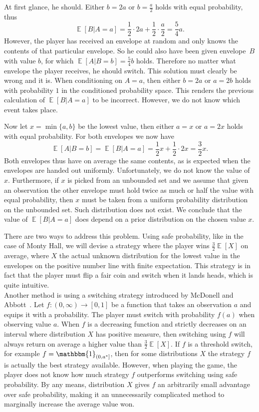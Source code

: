 \documentclass[a4paper]{report}
\theoremstyle{plain}
\theoremstyle{definition}
\theoremstyle{remark}
\numberwithin{equation}{chapter}
\DeclareMathOperator{\E}{\mathbb{E}}
\DeclareMathOperator{\1}{\mathbbm{1}}
\begin{document}
At first glance, he should. Either $b=2a$ or $b=\frac{a}{2}$ holds with equal probability, thus \[\E[B|A=a]=\frac{1}{2}\cdot2a+\frac{1}{2}\cdot\frac{a}{2}=\frac{5}{4}a.\]
However, the player has received an envelope at random and only knows the contents of that particular envelope. So he could also have been given envelope~$B$ with value $b$, for which $\E[A|B=b]=\frac{5}{4}b$ holds. Therefore no matter what envelope the player receives, he should switch. This solution must clearly be wrong and it is. When conditioning on $A=a$, then either $b=2a$ or $a=2b$ holds with probability $1$ in the conditioned probability space. This renders the previous calculation of $\E[B|A=a]$ to be incorrect. However, we do not know which event takes place.

Now let $x=\min\{a,b\}$ be the lowest value, then either $a=x$ or $a=2x$ holds with equal probability. For both envelopes we now have
\[
\E[A|B=b]=\E[B|A=a]=\frac{1}{2}x+\frac{1}{2}\cdot2x=\frac{3}{2}x.
\]
Both envelopes thus have on average the same contents, as is expected when the envelopes are handed out uniformly. Unfortunately, we do not know the value of $x$. Furthermore, if $x$ is picked from an unbounded set and we assume that given an observation the other envelope must hold twice as much or half the value with equal probability, then $x$ must be taken from a uniform probability distribution on the unbounded set. Such distribution does not exist. We conclude that the value of $\E[B|A=a]$ does depend on a prior distribution on the chosen value $x$.

There are two ways to address this problem. Using safe probability, like in the case of Monty Hall, we will devise a strategy where the player wins $\frac{3}{2}\E[X]$ on average, where $X$ the actual unknown distribution for the lowest value in the envelopes on the positive number line with finite expectation. This strategy is in fact that the player must flip a fair coin and switch when it lands heads, which is quite intuitive.\\
Another method is using a switching strategy introduced by McDonell and Abbott~\cite{McDonnell09,Abbott10,McDonnell11}. Let $f\colon (0,\infty)\to[0,1]$ be a function that takes an observation $a$ and equips it with a probability. The player must switch with probability $f(a)$ when observing value $a$. When $f$ is a decreasing function and strictly decreases on an interval where distribution $X$ has positive measure, then switching using $f$ will always return on average a higher value than $\frac{3}{2}\E[X]$. If $f$ is a threshold switch, for example $f=\1_{(0,a^*]}$, then for some distributions $X$ the strategy $f$ is actually the best strategy available. However, when playing the game, the player does not know how much strategy $f$ outperforms switching using safe probability. By any means, distribution $X$ gives $f$ an arbitrarily small advantage over safe probability, making it an unnecessarily complicated method to marginally increase the average value won.
\end{document}
